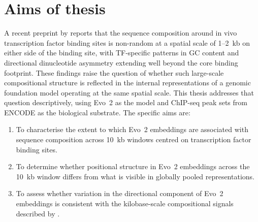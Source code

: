 \chapter{Aims of thesis}
\label{sec:aims}

\shorthandoff{-} 

A recent preprint by \citet{faltejskovaNonconsensusFlankingSequence2026a} reports that
the sequence composition around in vivo transcription factor binding sites is non-random
at a spatial scale of 1--2~kb on either side of the binding site, with TF-specific
patterns in GC content and directional dinucleotide asymmetry extending well beyond the
core binding footprint.
These findings raise the question of whether such large-scale compositional structure is
reflected in the internal representations of a genomic foundation model operating at the
same spatial scale.
This thesis addresses that question descriptively, using Evo~2 \cite{brixiGenomeModellingDesign2026}
as the model and ChIP-seq peak sets from ENCODE as the biological substrate.\newline \newline
The specific aims are:

\begin{enumerate}
  \item To characterise the extent to which Evo~2 embeddings are associated with
    sequence composition across 10~kb windows centred on transcription factor binding
    sites.
  \item To determine whether positional structure in Evo~2 embeddings across the 10~kb
    window differs from what is visible in globally pooled representations.
  \item To assess whether variation in the directional component of Evo~2 embeddings
    is consistent with the kilobase-scale compositional signals described by
    \citet{faltejskovaNonconsensusFlankingSequence2026a}.
\end{enumerate}

\shorthandon{-} 
